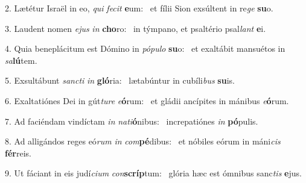 2. Lætétur Israël in eo, \textit{qui} \textit{fe}\textit{cit} \textbf{e}um: \ast\  et fílii Sion exsúltent in re\textit{ge} \textbf{su}o.\

3. Laudent nomen \textit{e}\textit{jus} \textit{in} \textbf{cho}ro: \ast\  in týmpano, et psaltério psal\textit{lant} \textbf{e}i.\

4. Quia beneplácitum est Dómino in \textit{pó}\textit{pu}\textit{lo} \textbf{su}o: \ast\  et exaltábit mansuétos in \textit{sa}\textbf{lú}tem.\

5. Exsultábunt \textit{sanc}\textit{ti} \textit{in} \textbf{gló}ria: \ast\  lætabúntur in cubíli\textit{bus} \textbf{su}is.\

6. Exaltatiónes Dei in gút\textit{tu}\textit{re} \textit{e}\textbf{ó}rum: \ast\  et gládii ancípites in mánibus \textit{e}\textbf{ó}rum.\

7. Ad faciéndam vindíctam \textit{in} \textit{na}\textit{ti}\textbf{ó}nibus: \ast\  increpatiónes \textit{in} \textbf{pó}pulis.\

8. Ad alligándos reges eó\textit{rum} \textit{in} \textit{com}\textbf{pé}dibus: \ast\  et nóbiles eórum in máni\textit{cis} \textbf{fér}reis.\

9. Ut fáciant in eis judí\textit{ci}\textit{um} \textit{con}\textbf{scríp}tum: \ast\  glória hæc est ómnibus sanc\textit{tis} \textbf{e}jus.\

